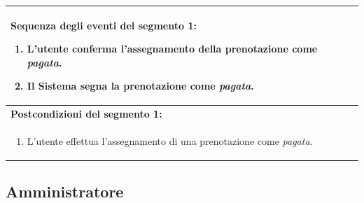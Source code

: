 \documentclass{article}
\begin{document}
\begin{table}[H]
\begin{tabular}{|p{\linewidth}|}
                        \hline
                        \textbf{Sequenza degli eventi del segmento 1:}
                        \begin{enumerate}
                            \item L'utente conferma l'assegnamento della prenotazione come \emph{pagata}.
                            \item Il Sistema segna la prenotazione come \emph{pagata}.
                        \end{enumerate} \\
                        \hline
                        \cellcolor{gray!20}
                        \textbf{Postcondizioni del segmento 1:} \\
                        \cellcolor{gray!20}
                        \begin{minipage}{\linewidth}
                            \begin{enumerate}
                                \item L'utente effettua l'assegnamento di una prenotazione come \emph{pagata}.
                            \end{enumerate}
                        \end{minipage} \\
                        \hline
                    \end{tabular}
                \end{table}

        \subsection{Amministratore}
\end{document}
